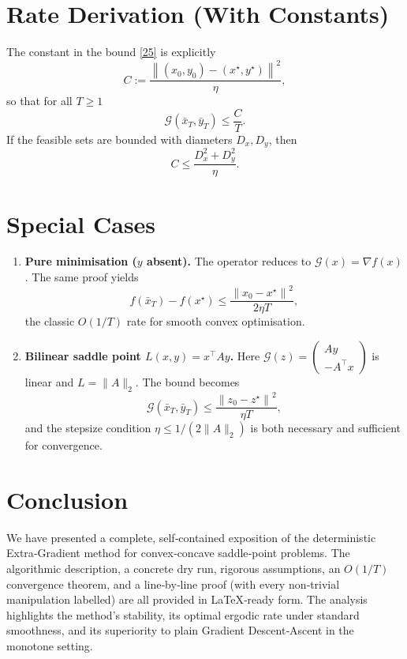 \documentclass{article}
\newcommand{\norm}[1]{\left\|#1\right\|}
\newcommand{\G}{\mathcal{G}}
\begin{document}
\section*{Rate Derivation (With Constants)}
The constant in the bound \eqref{25} is explicitly
\[
C:=\frac{\norm{(x_0,y_0)-(x^\star,y^\star)}^{2}}{\eta},
\]
so that for all $T\ge1$
\[
\mathcal{G}(\bar x_T,\bar y_T)\le \frac{C}{T}.
\]
If the feasible sets are bounded with diameters $D_x,D_y$, then
\[
C\le \frac{D_x^{2}+D_y^{2}}{\eta}.
\]

\section*{Special Cases}
\begin{enumerate}[noitemsep,topsep=0pt]
\item \textbf{Pure minimisation ($y$ absent).} The operator reduces to $\G(x)=\nabla f(x)$. The same proof yields
\[
f(\bar x_T)-f(x^\star)\le\frac{\norm{x_0-x^\star}^{2}}{2\eta T},
\]
the classic $O(1/T)$ rate for smooth convex optimisation.
\item \textbf{Bilinear saddle point $L(x,y)=x^\top Ay$.} Here $\G(z)=\begin{pmatrix}Ay\\-A^\top x\end{pmatrix}$ is linear and $L=\|A\|_2$. The bound becomes
\[
\mathcal{G}(\bar x_T,\bar y_T)\le\frac{\norm{z_0-z^\star}^{2}}{\eta T},
\]
and the stepsize condition $\eta\le1/(2\|A\|_2)$ is both necessary and sufficient for convergence.
\end{enumerate}

\section*{Conclusion}
We have presented a complete, self‑contained exposition of the deterministic Extra‑Gradient method for convex‑concave saddle‑point problems. The algorithmic description, a concrete dry run, rigorous assumptions, an $O(1/T)$ convergence theorem, and a line‑by‑line proof (with every non‑trivial manipulation labelled) are all provided in LaTeX‑ready form. The analysis highlights the method’s stability, its optimal ergodic rate under standard smoothness, and its superiority to plain Gradient Descent‑Ascent in the monotone setting. 
\end{document}
